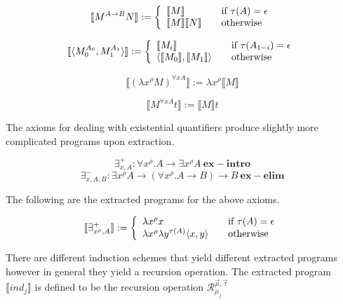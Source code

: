 \[
\llbracket M^{A \to B} N \rrbracket := \left\{ 
\begin{array}{l l}
\llbracket M \rrbracket  & \quad \text{if $\tau (A) = \epsilon$} \\ 
\llbracket M \rrbracket  \llbracket N \rrbracket & \quad \text{otherwise} \\

\end{array} \right.
 \]

\[
\llbracket \langle M^{A_0}_0, M^{A_1}_1 \rangle \rrbracket := \left\{ 
\begin{array}{l l}
\llbracket M_i \rrbracket  & \quad \text{if $\tau (A_{1-i}) = \epsilon$} \\ 
\langle \llbracket M_0 \rrbracket , \llbracket M_1 \rrbracket \rangle & \quad \text{otherwise} \\

\end{array} \right.
 \]


$$\llbracket ( \lambda x^{\rho} M)^{\forall x A} \rrbracket := \lambda x^{\rho} \llbracket   M \rrbracket$$

$$\llbracket M^{\forall x A} t \rrbracket := \llbracket M \rrbracket t$$


The axioms for dealing with existential quantifiers produce slightly more
complicated programs upon extraction. 

$$ \exists^+_{x,A} : \forall x^{\rho}.A \to \exists x^{\rho} A  \ \mathbf{ex-intro}$$
$$ \exists^-_{x,A,B} : \exists x^{\rho} A \to (\forall x^{\rho}. A \to B) \to
B  \ \mathbf{ex-elim}$$

The following are the extracted programs for the above axioms.

\[ \llbracket \exists^{+}_{x^{\rho}, A} \rrbracket := \left\{ 
\begin{array}{l l}
\lambda x^{\rho} x  & \quad \text{if $\tau (A) = \epsilon$} \\ 
\lambda x^{\rho} \lambda y^{\tau (A)} \langle x,y \rangle & \quad \text{otherwise} \\

\end{array} \right.
\]

There are different induction schemes  that yield different extracted programs however in general they yield a recursion operation. The extracted program $\llbracket ind_j \rrbracket$ is defined to be the recursion operation $\mathcal{R}^{\vec{\mu},\vec{\tau}}_{\mu_j}$



